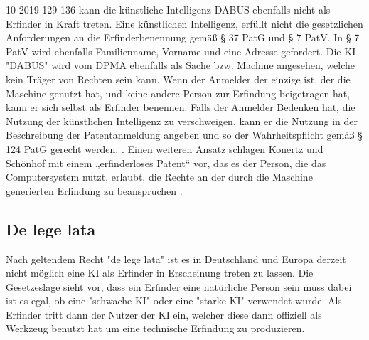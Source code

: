 10 2019 129 136 kann die künstliche Intelligenz 
DABUS ebenfalls nicht als Erfinder in Kraft treten. 
Eine künstlichen Intelligenz, 
erfüllt nicht die gesetzlichen Anforderungen an die Erfinderbenennung 
gemäß § 37 PatG und § 7 PatV. In § 7 PatV wird ebenfalls
Familienname, Vorname und eine Adresse gefordert. 
Die KI "DABUS" wird vom DPMA ebenfalls als 
Sache bzw. Machine angesehen, welche kein Träger von Rechten sein kann.
Wenn der Anmelder der einzige ist, 
der die Maschine genutzt hat, 
und keine andere Person zur Erfindung beigetragen hat, 
kann er sich selbst als Erfinder benennen. 
Falls der Anmelder Bedenken hat, 
die Nutzung der künstlichen Intelligenz zu verschweigen, 
kann er die Nutzung in der Beschreibung der Patentanmeldung angeben 
und so der Wahrheitspflicht gemäß § 124 PatG gerecht werden.
\cite{BPatG21122021}.
Einen weiteren Ansatz schlagen Konertz und Schönhof mit einem 
„erfinderloses Patent“ vor, das es der Person, 
die das Computersystem nutzt, erlaubt, 
die Rechte an der durch die Maschine generierten Erfindung zu beanspruchen
\cite{konertzErfindungenDurchComputer2018}.

\subsection{De lege lata}
Nach geltendem Recht "de lege lata" ist es in Deutschland und Europa
derzeit nicht möglich eine KI als Erfinder in Erscheinung treten zu lassen.
Die Gesetzeslage sieht vor, dass ein Erfinder eine natürliche Person sein muss
dabei ist es egal, ob eine "schwache KI" oder eine "starke KI" verwendet wurde.
Als Erfinder tritt dann der Nutzer der KI ein, welcher diese dann offiziell
als Werkzeug benutzt hat um eine technische Erfindung zu produzieren.


